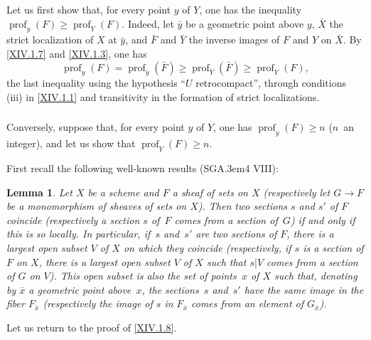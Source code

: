 \documentclass[11pt,a4paper,oneside]{book}
\providecommand{\sisi}[2]{#2}
\providecommand{\pageoriginale}{%
  \refstepcounter{pageoriginal}%
  \marginpar{\raggedright\footnotesize\bfseries\thepageoriginal}%
  \xspace}
\providecommand{\og}{``}
\providecommand{\fg}{''\xspace}
\providecommand{\SGA}{\textup{SGA}\kern.3em}
\providecommand{\prof}{\operatorname{prof}}
\theoremstyle{plain}
\newtheorem{subsublemme}[subsubsection]{Lemma}
\theoremstyle{definition}
\theoremstyle{remark}
\renewcommand{\Ref}[1]{\textup{\ref{#1}}}
\begin{document}
\subsubsection{} \label{XIV.1.8.1} Let us first show that, for every point $y$ of $Y$, one has the inequality $\prof_y(F)\geq \prof_Y(F)$. Indeed, let $\bar y$ be a geometric point above $y$, $\bar X$ the strict localization of $X$ at $\bar y$, and $\bar F$ and $\bar Y$ the inverse images of $F$ and $Y$ on $\bar X$. By \Ref{XIV.1.7} and \Ref{XIV.1.3}, one has
$$
\prof_y(F)=\prof_{\bar y}(\bar F)\geq \prof_{\bar Y}(\bar F)\geq \prof_Y(F),
$$
the last inequality using the hypothesis \og $U$ retrocompact\fg, through conditions \textup{(iii)} in \Ref{XIV.1.1} and transitivity in the formation of strict localizations.

\subsubsection{} \label{XIV.1.8.2}
Conversely, suppose that, for every point $y$ of $Y$, one has $\prof_y(\sisi{Y}{F})\geq n$ ($n$~an integer), and let us show that $\prof_Y(F)\geq n$.

First recall\pageoriginale the following well-known results \textup{(\SGA 4 VIII)}:

\begin{subsublemme} \label{XIV.1.8.2.1}
Let $X$ be a scheme and $F$ a sheaf of sets on $X$ (respectively let $G\to F$ be a monomorphism of sheaves of sets on $X$). Then two sections $s$ and $s'$ of $F$ coincide (respectively a section $s$ of~$F$ comes from a section of~$G$) if and only if this is so locally. In particular, if~$s$ and~$s'$ are two sections of $F$, there is a largest open subset $V$ of $X$ on which they coincide (respectively, if $s$ is a section of $F$ on $X$, there is a largest open subset $V$ of $X$ such that $s|V$ comes from a section of $G$ on $V$). This open subset is also the set of points~$x$ of $X$ such that, denoting by $\bar x$ a geometric point above~$x$, the sections~$s$ and~$s'$ have the same image in the fiber $F_{\bar x}$ (respectively the image of $s$ in $F_{\bar x}$ comes from an element of $G_{\bar x}$).
\end{subsublemme}

Let us return to the proof of \Ref{XIV.1.8}.
\end{document}

